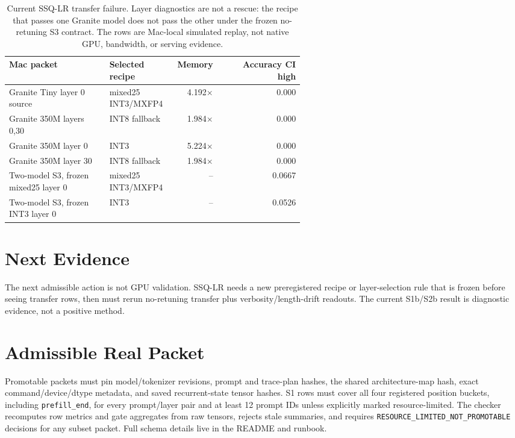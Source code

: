 \documentclass{article}
\begin{document}
\begin{table}[h]
\centering
\small
\begin{tabular}{p{0.34\linewidth}p{0.23\linewidth}rr}
\toprule
Mac packet & Selected recipe & Memory & Accuracy CI high \\
\midrule
Granite Tiny layer 0 source & mixed25 INT3/MXFP4 & 4.192$\times$ & 0.000 \\
Granite 350M layers 0,30 & INT8 fallback & 1.984$\times$ & 0.000 \\
Granite 350M layer 0 & INT3 & 5.224$\times$ & 0.000 \\
Granite 350M layer 30 & INT8 fallback & 1.984$\times$ & 0.000 \\
Two-model S3, frozen mixed25 layer 0 & mixed25 INT3/MXFP4 & -- & 0.0667 \\
Two-model S3, frozen INT3 layer 0 & INT3 & -- & 0.0526 \\
\bottomrule
\end{tabular}
\caption{Current SSQ-LR transfer failure. Layer diagnostics are not a rescue:
the recipe that passes one Granite model does not pass the other under the
frozen no-retuning S3 contract. The rows are Mac-local simulated replay, not
native GPU, bandwidth, or serving evidence.}
\end{table}

\section{Next Evidence}

The next admissible action is not GPU validation. SSQ-LR needs a new
preregistered recipe or layer-selection rule that is frozen before seeing
transfer rows, then must rerun no-retuning transfer plus verbosity/length-drift
readouts. The current S1b/S2b result is diagnostic evidence, not a positive
method.

\section{Admissible Real Packet}

Promotable packets must pin model/tokenizer revisions, prompt and trace-plan
hashes, the shared architecture-map hash, exact command/device/dtype metadata,
and saved recurrent-state tensor hashes. S1 rows must cover all four registered
position buckets, including \texttt{prefill\_end}, for every prompt/layer pair
and at least 12 prompt IDs unless explicitly marked resource-limited. The
checker recomputes row metrics and gate aggregates from raw tensors, rejects
stale summaries, and requires
\texttt{RESOURCE\_LIMITED\_NOT\_PROMOTABLE} decisions for any subset packet.
Full schema details live in the README and runbook.
\end{document}
